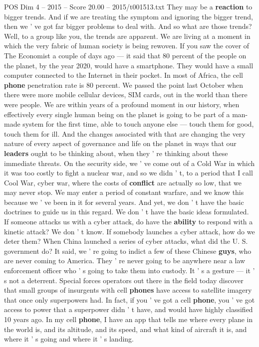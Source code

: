 \begin{textsample}{POS Dim 4 – 2015 – Score 20.00 – 2015/t001513.txt}
They may be a \textbf{reaction} to bigger trends.
And if we are treating the symptom and ignoring the bigger trend, then we ' ve got far bigger problems to deal with.
And so what are those trends?
Well, to a group like you, the trends are apparent.
We are living at a moment in which the very fabric of human society is being rewoven.
If you saw the cover of The Economist a couple of days ago — it said that 80 percent of the people on the planet, by the year 2020, would have a smartphone.
They would have a small computer connected to the Internet in their pocket.
In most of Africa, the cell \textbf{phone} penetration rate is 80 percent.
We passed the point last October when there were more mobile cellular devices, SIM cards, out in the world than there were people.
We are within years of a profound moment in our history, when effectively every single human being on the planet is going to be part of a man-made system for the first time, able to touch anyone else — touch them for good, touch them for ill.
And the changes associated with that are changing the very nature of every aspect of governance and life on the planet in ways that our \textbf{leaders} ought to be thinking about, when they ' re thinking about these immediate threats.
On the security side, we ' ve come out of a Cold War in which it was too costly to fight a nuclear war, and so we didn ' t, to a period that I call Cool War, cyber war, where the costs of \textbf{conflict} are actually so low, that we may never stop.
We may enter a period of constant warfare, and we know this because we ' ve been in it for several years.
And yet, we don ' t have the basic doctrines to guide us in this regard.
We don ' t have the basic ideas formulated.
If someone attacks us with a cyber attack, do have the \textbf{ability} to respond with a kinetic attack?
We don ' t know.
If somebody launches a cyber attack, how do we deter them?
When China launched a series of cyber attacks, what did the U.
S. government do?
It said, we ' re going to indict a few of these Chinese \textbf{guys}, who are never coming to America.
They ' re never going to be anywhere near a law enforcement officer who ' s going to take them into custody.
It ' s a gesture — it ' s not a deterrent.
Special forces operators out there in the field today discover that small groups of insurgents with cell \textbf{phones} have access to satellite imagery that once only superpowers had.
In fact, if you ' ve got a cell \textbf{phone}, you ' ve got access to power that a superpower didn ' t have, and would have highly classified 10 years ago.
In my cell \textbf{phone}, I have an app that tells me where every plane in the world is, and its altitude, and its speed, and what kind of aircraft it is, and where it ' s going and where it ' s landing.

\end{textsample}
